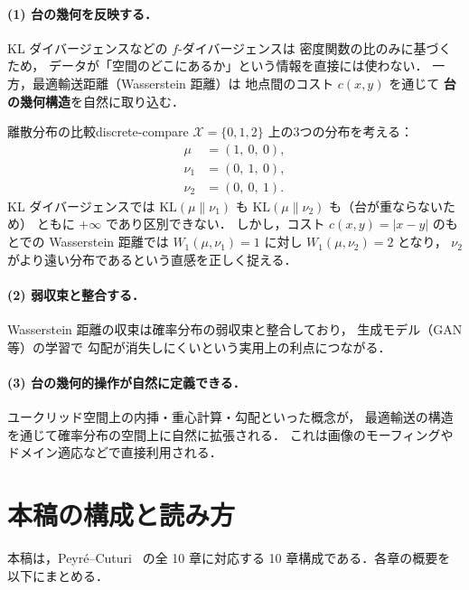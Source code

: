 \paragraph{(1) 台の幾何を反映する．}
KL ダイバージェンスなどの $f$-ダイバージェンスは
密度関数の比のみに基づくため，
データが「空間のどこにあるか」という情報を直接には使わない．
一方，最適輸送距離（Wasserstein 距離）は
地点間のコスト $c(x, y)$ を通じて
\textbf{台の幾何構造}を自然に取り込む．

\begin{example}{離散分布の比較}{discrete-compare}
$\mathcal{X} = \{0, 1, 2\}$ 上の3つの分布を考える：
\begin{align*}
  \mu &= (1,\ 0,\ 0), \\
  \nu_1 &= (0,\ 1,\ 0), \\
  \nu_2 &= (0,\ 0,\ 1).
\end{align*}
KL ダイバージェンスでは $\mathrm{KL}(\mu \| \nu_1)$
も $\mathrm{KL}(\mu \| \nu_2)$ も（台が重ならないため）
ともに $+\infty$ であり区別できない．
しかし，コスト $c(x,y) = |x - y|$ のもとでの
Wasserstein 距離では $W_1(\mu, \nu_1) = 1$ に対し
$W_1(\mu, \nu_2) = 2$ となり，
$\nu_2$ がより遠い分布であるという直感を正しく捉える．
\end{example}

\paragraph{(2) 弱収束と整合する．}
Wasserstein 距離の収束は確率分布の弱収束と整合しており，
生成モデル（GAN 等）の学習で
勾配が消失しにくいという実用上の利点につながる．

\paragraph{(3) 台の幾何的操作が自然に定義できる．}
ユークリッド空間上の内挿・重心計算・勾配といった概念が，
最適輸送の構造を通じて確率分布の空間上に自然に拡張される．
これは画像のモーフィングやドメイン適応などで直接利用される．


\section{本稿の構成と読み方}\label{sec:outline}

本稿は，Peyré--Cuturi~\cite{PeyreCuturi2019} の全 10 章に対応する
10 章構成である．各章の概要を以下にまとめる．

\medskip

